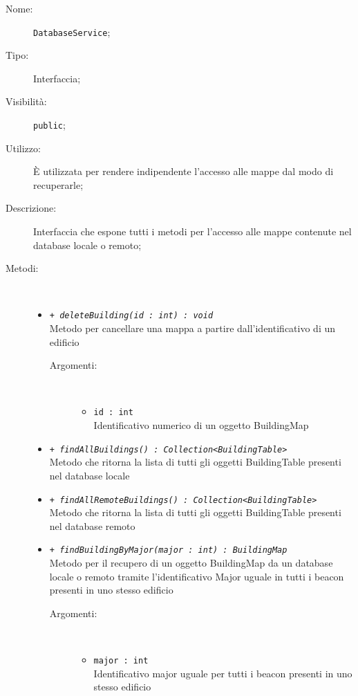 \documentclass[../DefinizioneDiProdotto.tex]{subfiles}
\begin{document}
    \begin{description}
\item[Nome:] \texttt{DatabaseService};
\item[Tipo:] Interfaccia;
\item[Visibilità:] \texttt{public};
\item[Utilizzo:] È utilizzata per rendere indipendente l'accesso alle mappe dal modo di recuperarle;
\item[Descrizione:] Interfaccia che espone tutti i metodi per l'accesso alle mappe contenute nel database locale o remoto;
\item[Metodi:] \
\begin{itemize}
\item \texttt{+ \textit{deleteBuilding(id : int) : void}}\\
Metodo per cancellare una mappa a partire dall'identificativo di un edificio
 \begin{description}
\item[Argomenti:] \
\begin{itemize}
\item \texttt{id : int}\\
Identificativo numerico di un oggetto BuildingMap\end{itemize}
\end{description}
\item \texttt{+ \textit{findAllBuildings() : Collection<BuildingTable>}}\\
Metodo che ritorna la lista di tutti gli oggetti BuildingTable presenti nel database locale
 \item \texttt{+ \textit{findAllRemoteBuildings() : Collection<BuildingTable>}}\\
Metodo che ritorna la lista di tutti gli oggetti BuildingTable presenti nel database remoto
 \item \texttt{+ \textit{findBuildingByMajor(major : int) : BuildingMap}}\\
Metodo per il recupero di un oggetto BuildingMap da un database locale o remoto tramite l'identificativo Major uguale in tutti i beacon presenti in uno stesso edificio
 \begin{description}
\item[Argomenti:] \
\begin{itemize}
\item \texttt{major : int}\\
Identificativo major uguale per tutti i beacon presenti in uno stesso edificio\end{itemize}

\end{description}
\end{itemize}
\end{description}
\end{document}
